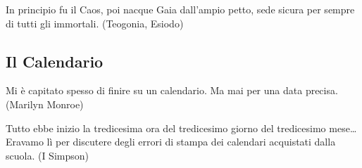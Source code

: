\vfill

\begin{enfasi}
In principio fu il Caos, poi nacque Gaia dall'ampio petto, sede sicura per sempre di tutti gli immortali. (Teogonia, Esiodo)
\end{enfasi}




\pagebreak

\subsection{Il Calendario}

\begin{enfasi}{
Mi è capitato spesso di finire su un calendario. Ma mai per una data precisa. (Marilyn Monroe)

\medskip

Tutto ebbe inizio la tredicesima ora del tredicesimo giorno del tredicesimo mese… Eravamo lì per discutere degli errori di stampa dei calendari acquistati dalla scuola. (I Simpson)} \end{enfasi}

\medskip

